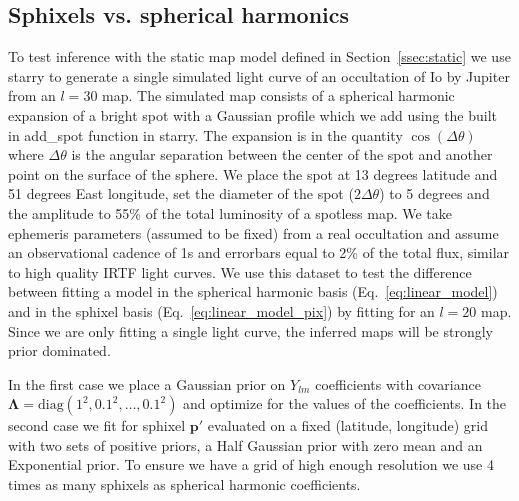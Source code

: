 \documentclass[modern]{aastex62}
\begin{document}
\subsection{Sphixels vs. spherical harmonics}
\label{ssec:sphixels_vs_harmonics}
To test inference with the static map model defined in Section~\ref{ssec:static} 
we use \textsf{starry} to generate a single simulated light curve of an occultation of Io by Jupiter from an $l=30$ map.
The simulated map consists of a spherical harmonic expansion of a bright spot with a Gaussian profile which we add using the built in \textsf{add\_spot} function in \textsf{starry}.
The expansion is in the quantity $\cos(\Delta\theta)$ where $\Delta\theta$ is the angular separation between the center of the spot and another point on the surface of the sphere. 
We place the spot at 13 degrees latitude and 51 degrees East longitude, set the diameter of the spot ($2\Delta\theta$) to 5 degrees and the amplitude to 55\% of the total luminosity of a spotless map.
We take ephemeris parameters (assumed to be fixed) from a real occultation and assume an observational cadence of 1s and errorbars equal to 2\% of the total flux, similar to high quality IRTF light curves.
We use this dataset to test the difference between fitting a model in the spherical harmonic basis (Eq.~\ref{eq:linear_model}) and in the sphixel basis (Eq.~\ref{eq:linear_model_pix})
by fitting for an $l=20$ map.
Since we are only fitting a single light curve, the inferred maps will be strongly prior dominated.

In the first case we place a Gaussian prior on $Y_{lm}$ coefficients with covariance $\boldsymbol{\Lambda}=\mathrm{diag}(1^2,0.1^2,\dots,0.1^2)$ and optimize for the values of the coefficients.
In the second case we fit for sphixel $\mathbf{p}'$ evaluated on a fixed (latitude, longitude) grid with two sets of positive priors, a Half Gaussian prior with zero mean and an Exponential prior.
To ensure we have a grid of high enough resolution we use 4 times as many sphixels as spherical harmonic coefficients.
\end{document}
